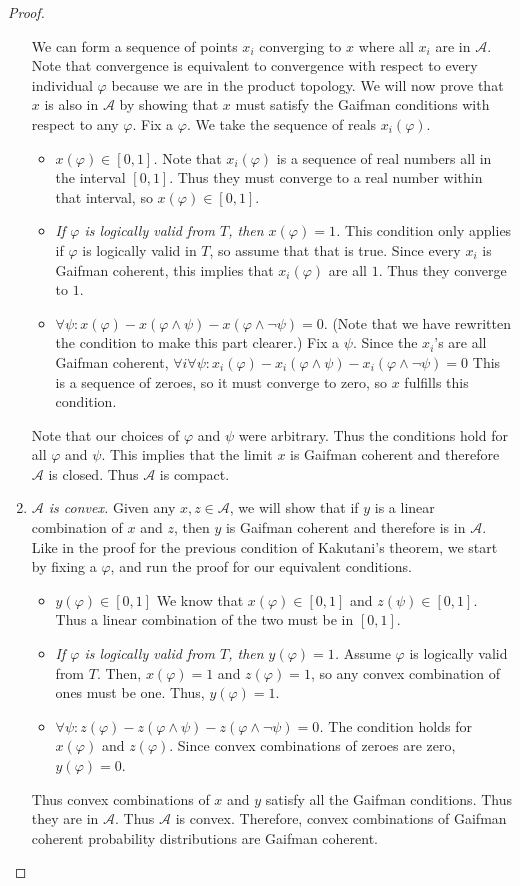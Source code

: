 \documentclass[12pt]{article}
\newcommand{\vp}{\varphi}
\theoremstyle{plain}
\theoremstyle{definition}
\theoremstyle{remark}
\begin{document}
\begin{proof}
\begin{enumerate}
We can form a sequence of points $x_i$ converging to $x$ where all $x_i$ are in $\mathcal{A}$.
Note that convergence is equivalent to convergence with respect to every individual $\vp$ because we are in the product topology.
We will now prove that $x$ is also in $\mathcal{A}$ by showing that $x$ must satisfy the Gaifman conditions with respect to any $\vp$. 
Fix a $\vp$.
We take the sequence of reals $x_i(\vp)$.
\begin{itemize}
\item \emph{$x(\vp)\in [0,1]$.}
Note that $x_i(\vp)$ is a sequence of real numbers all in the interval $[0, 1]$.
Thus they must converge to a real number within that interval, so $x(\vp)\in[0,1]$.
\item \emph{If $\vp$ is logically valid from $T$, then $x(\vp)=1$.}
This condition only applies if $\vp$ is logically valid in $T$, so assume that that is true.
Since every $x_i$ is Gaifman coherent, this implies that $x_i(\vp)$ are all $1$. Thus they converge to $1$.
\item $\forall \psi: x(\vp) -x(\vp\wedge\psi)-x(\vp\wedge\neg\psi)=0$.
(Note that we have rewritten the condition to make this part clearer.)
Fix a $\psi$.
Since the $x_i$'s are all Gaifman coherent, $\forall i\forall \psi: x_i(\vp) -x_i(\vp\wedge\psi)-x_i(\vp\wedge\neg\psi)=0$
This is a sequence of zeroes, so it must converge to zero, so $x$ fulfills this condition.
\end{itemize}
Note that our choices of $\vp$ and $\psi$ were arbitrary. Thus the conditions hold for all $\vp$ and $\psi$. This implies that the limit $x$ is Gaifman coherent and therefore $\mathcal{A}$ is closed.
Thus $\mathcal{A}$ is compact.

\item \emph{$\mathcal{A}$ is convex.}
Given any $x,z\in\mathcal{A}$, we will show that if $y$ is a linear combination of $x$ and $z$, then $y$ is Gaifman coherent and therefore is in $\mathcal{A}$.
Like in the proof for the previous condition of Kakutani's theorem, we start by fixing a $\vp$, and run the proof for our equivalent conditions.
\begin{itemize}
\item \emph{$y(\vp) \in [0, 1]$}
We know that $x(\vp) \in [0,1]$ and $z(\psi) \in [0,1]$.
Thus a linear combination of the two must be in $[0,1]$.
\item \emph{If $\vp$ is logically valid from $T$, then $y(\vp)=1$.}
Assume $\vp$ is logically valid from $T$.
Then, $x(\vp)=1$ and $z(\vp)=1$, so any convex combination of ones must be one.
Thus, $y(\vp) = 1$.
\item \emph{$\forall \psi: z(\vp) -z(\vp\wedge\psi)-z(\vp\wedge\neg\psi)=0$.}
The condition holds for $x(\vp)$ and $z(\vp)$.
Since convex combinations of zeroes are zero, $y(\vp)=0$.
\end{itemize}
Thus convex combinations of $x$ and $y$ satisfy all the Gaifman conditions. Thus they are in $\mathcal{A}$. Thus $\mathcal{A}$ is convex.
Therefore, convex combinations of Gaifman coherent probability distributions are Gaifman coherent.


\end{enumerate}
\end{proof}
\end{document}
